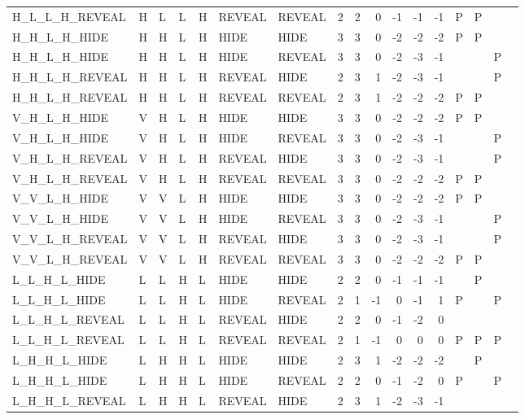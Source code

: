\begin{longtable}{lllllllrrrrrrllll}
  H\_L\_L\_H\_REVEAL & H & L & L & H & REVEAL & REVEAL & 2 & 2 & 0 & -1 & -1 & -1 & P & P &  &  \\ 
  H\_H\_L\_H\_HIDE & H & H & L & H & HIDE & HIDE & 3 & 3 & 0 & -2 & -2 & -2 & P & P &  &  \\ 
  H\_H\_L\_H\_HIDE & H & H & L & H & HIDE & REVEAL & 3 & 3 & 0 & -2 & -3 & -1 &  &  & P &  \\ 
  H\_H\_L\_H\_REVEAL & H & H & L & H & REVEAL & HIDE & 2 & 3 & 1 & -2 & -3 & -1 &  &  & P &  \\ 
  H\_H\_L\_H\_REVEAL & H & H & L & H & REVEAL & REVEAL & 2 & 3 & 1 & -2 & -2 & -2 & P & P &  &  \\ 
  V\_H\_L\_H\_HIDE & V & H & L & H & HIDE & HIDE & 3 & 3 & 0 & -2 & -2 & -2 & P & P &  &  \\ 
  V\_H\_L\_H\_HIDE & V & H & L & H & HIDE & REVEAL & 3 & 3 & 0 & -2 & -3 & -1 &  &  & P &  \\ 
  V\_H\_L\_H\_REVEAL & V & H & L & H & REVEAL & HIDE & 3 & 3 & 0 & -2 & -3 & -1 &  &  & P &  \\ 
  V\_H\_L\_H\_REVEAL & V & H & L & H & REVEAL & REVEAL & 3 & 3 & 0 & -2 & -2 & -2 & P & P &  &  \\ 
  V\_V\_L\_H\_HIDE & V & V & L & H & HIDE & HIDE & 3 & 3 & 0 & -2 & -2 & -2 & P & P &  &  \\ 
  V\_V\_L\_H\_HIDE & V & V & L & H & HIDE & REVEAL & 3 & 3 & 0 & -2 & -3 & -1 &  &  & P &  \\ 
  V\_V\_L\_H\_REVEAL & V & V & L & H & REVEAL & HIDE & 3 & 3 & 0 & -2 & -3 & -1 &  &  & P &  \\ 
  V\_V\_L\_H\_REVEAL & V & V & L & H & REVEAL & REVEAL & 3 & 3 & 0 & -2 & -2 & -2 & P & P &  &  \\ 
  L\_L\_H\_L\_HIDE & L & L & H & L & HIDE & HIDE & 2 & 2 & 0 & -1 & -1 & -1 &  & P &  &  \\ 
  L\_L\_H\_L\_HIDE & L & L & H & L & HIDE & REVEAL & 2 & 1 & -1 & 0 & -1 & 1 & P &  & P &  \\ 
  L\_L\_H\_L\_REVEAL & L & L & H & L & REVEAL & HIDE & 2 & 2 & 0 & -1 & -2 & 0 &  &  &  &  \\ 
  L\_L\_H\_L\_REVEAL & L & L & H & L & REVEAL & REVEAL & 2 & 1 & -1 & 0 & 0 & 0 & P & P & P &  \\ 
  L\_H\_H\_L\_HIDE & L & H & H & L & HIDE & HIDE & 2 & 3 & 1 & -2 & -2 & -2 &  & P &  &  \\ 
  L\_H\_H\_L\_HIDE & L & H & H & L & HIDE & REVEAL & 2 & 2 & 0 & -1 & -2 & 0 & P &  & P &  \\ 
  L\_H\_H\_L\_REVEAL & L & H & H & L & REVEAL & HIDE & 2 & 3 & 1 & -2 & -3 & -1 &  &  &  &  \\ 

\end{longtable}
